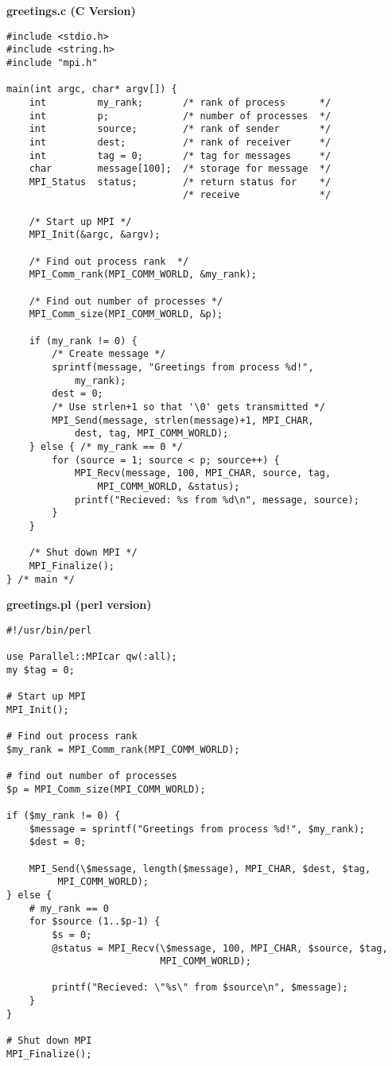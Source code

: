 \documentclass{report}
\begin{document}
\begin{center} \bf{greetings.c} (C Version)\end{center}
\begin{verbatim}
#include <stdio.h>
#include <string.h>
#include "mpi.h"

main(int argc, char* argv[]) {
    int         my_rank;       /* rank of process      */
    int         p;             /* number of processes  */
    int         source;        /* rank of sender       */
    int         dest;          /* rank of receiver     */
    int         tag = 0;       /* tag for messages     */
    char        message[100];  /* storage for message  */
    MPI_Status  status;        /* return status for    */
                               /* receive              */
   
    /* Start up MPI */
    MPI_Init(&argc, &argv);

    /* Find out process rank  */
    MPI_Comm_rank(MPI_COMM_WORLD, &my_rank);

    /* Find out number of processes */
    MPI_Comm_size(MPI_COMM_WORLD, &p);

    if (my_rank != 0) {
        /* Create message */
        sprintf(message, "Greetings from process %d!",
            my_rank);
        dest = 0;
        /* Use strlen+1 so that '\0' gets transmitted */
        MPI_Send(message, strlen(message)+1, MPI_CHAR, 
            dest, tag, MPI_COMM_WORLD);
    } else { /* my_rank == 0 */
        for (source = 1; source < p; source++) {
            MPI_Recv(message, 100, MPI_CHAR, source, tag, 
                MPI_COMM_WORLD, &status);
            printf("Recieved: %s from %d\n", message, source);
        }
    }

    /* Shut down MPI */
    MPI_Finalize();
} /* main */
\end{verbatim}

\begin{center} \bf{greetings.pl} (perl version) \end{center}
\begin{verbatim}
#!/usr/bin/perl 

use Parallel::MPIcar qw(:all);
my $tag = 0;

# Start up MPI
MPI_Init();

# Find out process rank
$my_rank = MPI_Comm_rank(MPI_COMM_WORLD);

# find out number of processes
$p = MPI_Comm_size(MPI_COMM_WORLD);

if ($my_rank != 0) {
    $message = sprintf("Greetings from process %d!", $my_rank);
    $dest = 0;
    
    MPI_Send(\$message, length($message), MPI_CHAR, $dest, $tag,
	     MPI_COMM_WORLD);
} else { 
    # my_rank == 0
    for $source (1..$p-1) {
        $s = 0;
        @status = MPI_Recv(\$message, 100, MPI_CHAR, $source, $tag, 
                           MPI_COMM_WORLD);	
	
        printf("Recieved: \"%s\" from $source\n", $message);
    }
}

# Shut down MPI 
MPI_Finalize();
\end{verbatim}
\end{document}
